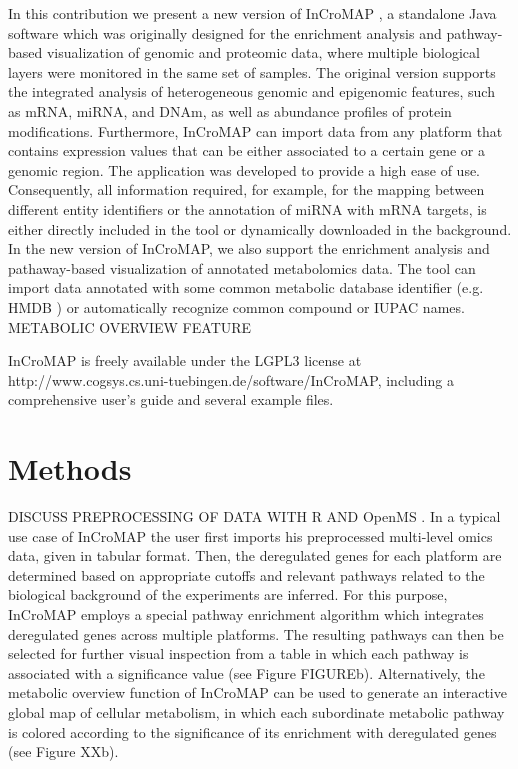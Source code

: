 \documentclass[final,5p,times,twocolumn]{elsarticle}
\begin{document}
In this contribution we present a new version of InCroMAP \cite{Wrzodek2012a,Wrzodek2012b}, a standalone Java software which was originally designed for the enrichment analysis and pathway-based visualization of genomic and proteomic data, where multiple biological layers were monitored in the same set of samples. The original version supports the integrated analysis of heterogeneous genomic and epigenomic features, such as mRNA, miRNA, and DNAm, as well as abundance profiles of protein modifications. Furthermore, InCroMAP can import data from any platform that contains expression values that can be either associated to a certain gene or a genomic region. The application was developed to provide a high ease of use. Consequently, all information required, for example, for the mapping between different entity identifiers or the annotation of miRNA with mRNA targets, is either directly included in the tool or dynamically downloaded in the background. In the new version of InCroMAP, we also support the enrichment analysis and pathaway-based visualization of annotated metabolomics data. The tool can import data annotated with some common metabolic database identifier (e.g. HMDB \cite{Wishart2009}) or automatically recognize common compound or IUPAC names. METABOLIC OVERVIEW FEATURE

InCroMAP is freely available under the LGPL3 license at http://www.cogsys.cs.uni-tuebingen.de/software/InCroMAP, including a comprehensive user’s guide and several example files.

\section{Methods}
DISCUSS PREPROCESSING OF DATA WITH R AND OpenMS \cite{Sturm2008}.
In a typical use case of InCroMAP the user first imports his preprocessed multi-level omics data, given in tabular format. Then, the deregulated genes for each platform are determined based on appropriate cutoffs and relevant pathways related to the biological background of the experiments are inferred. For this purpose, InCroMAP employs a special pathway enrichment algorithm which integrates deregulated genes across multiple platforms. The resulting pathways can then be selected for further visual inspection from a table in which each pathway is associated with a significance value (see Figure FIGUREb). Alternatively, the metabolic overview function of InCroMAP can be used to generate an interactive global map of cellular metabolism, in which each subordinate metabolic pathway is colored according to the significance of its enrichment with deregulated genes (see Figure XXb). 
\end{document}
